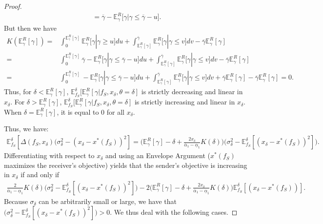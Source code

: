 \documentclass[11pt,dvipsnames]{article}
\begin{document}
\begin{appendix}
\begin{proof}
\begin{align*}
=
\overline{\gamma}-\mathbb{E}_\gamma^R\big[\gamma|\gamma \leq \overline{\gamma}-u].
\end{align*}
But then we have 
\begin{align*}
K(\mathbb{E}_\gamma^R[\gamma]) =&\int_0^{\mathbb{E}_\gamma^R[\gamma]} \mathbb{E}_\gamma^R\big[\gamma| \gamma \geq u\big]du
+\int_{\mathbb{E}_\gamma^R[\gamma]}^{\overline{\gamma}} \mathbb{E}_\gamma^R\big[\gamma| \gamma \leq v\big]dv-\overline{\gamma}\mathbb{E}_\gamma^R[\gamma]
\\	
=&\int_0^{\mathbb{E}_\gamma^R[\gamma]} \overline{\gamma}-\mathbb{E}_\gamma^R\big[\gamma|\gamma \leq \overline{\gamma}-u]du
+\int_{\mathbb{E}_\gamma^R[\gamma]}^{\overline{\gamma}} \mathbb{E}_\gamma^R\big[\gamma| \gamma \leq v\big]dv-\overline{\gamma}\mathbb{E}_\gamma^R[\gamma]
\\
=&\int_0^{\mathbb{E}_\gamma^R[\gamma]}-\mathbb{E}_\gamma^R\big[\gamma|\gamma \leq \overline{\gamma}-u]du
+\int_{\mathbb{E}_\gamma^R[\gamma]}^{\overline{\gamma}} \mathbb{E}_\gamma^R\big[\gamma| \gamma \leq v\big]dv+\overline{\gamma}\mathbb{E}_\gamma^R[\gamma]
-\overline{\gamma}\mathbb{E}_\gamma^R[\gamma]
=0.
\end{align*}
Thus, for $\delta < \mathbb{E}_\gamma^R[\gamma]$,  $\mathbb{E}_{f_S}^\delta\big[\mathbb{E}_\gamma^R[\gamma|f_S,x_\delta,\theta=\delta]$ is strictly decreasing and linear in $x_\delta$.
For $\delta > \mathbb{E}_\gamma^R[\gamma]$,  $\mathbb{E}_{f_S}^\delta\big[\mathbb{E}_\gamma^R[\gamma|f_S,x_\delta,\theta=\delta]$ is strictly increasing and linear in $x_\delta$.
When $\delta = \mathbb{E}_\gamma^R[\gamma]$, it is equal to $0$ for all $x_\delta$.

Thus, we have:
\begin{align*}
\mathbb{E}_{f_S}^\delta[\Delta(f_S,x_\delta)(\sigma_\delta^2-(x_\delta-x^*(f_S))^2]	
= \bigg(\mathbb{E}_\gamma^R[\gamma]
- \delta +
\frac{2x_\delta}{{\overline{\alpha}_1-\underline{\alpha}_1}}K(\delta)\bigg)
\big(\sigma_\delta^2-\mathbb{E}_{f_S}^\delta[(x_\delta-x^*(f_S))^2]\big).
\end{align*}
Differentiating with respect to $x_\delta$ and using an Envelope Argument ($x^*(f_S)$ maximizes the receiver's objective) yields that the sender's objective is increasing in $x_\delta$ if and only if 
\begin{align*}
\frac{2}{{\overline{\alpha}_1-\underline{\alpha}_1}}K(\delta)\big(\sigma_\delta^2-\mathbb{E}_{f_S}^\delta[(x_\delta-x^*(f_S))^2]\big)
-2\bigg(\mathbb{E}_\gamma^R[\gamma]
- \delta +
\frac{2x_\delta}{{\overline{\alpha}_1-\underline{\alpha}_1}}K(\delta)\bigg)\mathbb{E}_{f_S}^\delta[(x_\delta-x^*(f_S))].
\end{align*}
Because $\sigma_\delta$ can be arbitrarily small or large, we have that $\big(\sigma_\delta^2-\mathbb{E}_{f_S}^\delta[(x_\delta-x^*(f_S))^2]\big)>0$.
We thus deal with the following cases.



\end{proof}
\end{appendix}
\end{document}
